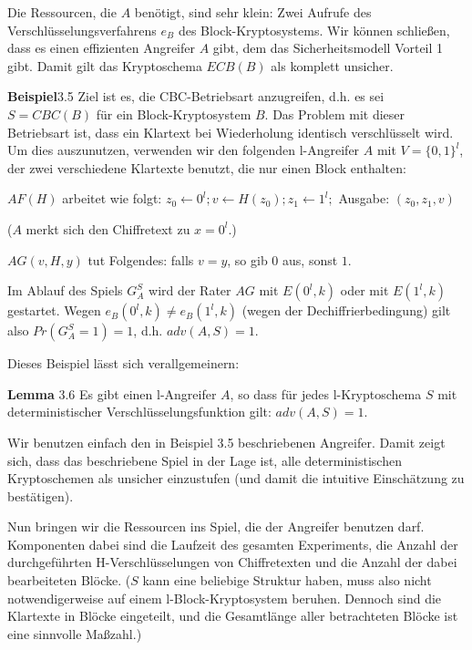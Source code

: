 \documentclass[a4paper]{article}
\begin{document}
\begin{multicols}{3}
    Die Ressourcen, die $A$ benötigt, sind sehr klein: Zwei Aufrufe des Verschlüsselungsverfahrens $e_B$ des Block-Kryptosystems. Wir können schließen, dass es einen effizienten Angreifer $A$ gibt, dem das Sicherheitsmodell Vorteil 1 gibt. Damit gilt das Kryptoschema $ECB(B)$ als komplett unsicher.

    \textbf{Beispiel}3.5 Ziel ist es, die CBC-Betriebsart anzugreifen, d.h. es sei $S=CBC(B)$ für ein Block-Kryptosystem $B$. Das Problem mit dieser Betriebsart ist, dass ein Klartext bei Wiederholung identisch verschlüsselt wird. Um dies auszunutzen, verwenden wir den folgenden l-Angreifer $A$ mit $V=\{0,1\}^l$, der zwei verschiedene Klartexte benutzt, die nur einen Block enthalten:
    \begin{itemize*}
        \item $AF(H)$ arbeitet wie folgt: $z_0\leftarrow 0^l;v\leftarrow H(z_0);z_1\leftarrow 1^l;$ Ausgabe: $(z_0,z_1,v)$
        \item ($A$ merkt sich den Chiffretext zu $x=0^l$.)
        \item $AG(v,H,y)$ tut Folgendes: falls $v=y$, so gib $0$ aus, sonst $1$.
    \end{itemize*}

    Im Ablauf des Spiels $G^S_A$ wird der Rater $AG$ mit $E(0^l,k)$ oder mit $E(1^l,k)$ gestartet. Wegen $e_B(0^l,k)\not=e_B(1^l,k)$ (wegen der Dechiffrierbedingung) gilt also $Pr(G^S_A=1)=1$, d.h. $adv(A,S)=1$.

    Dieses Beispiel lässt sich verallgemeinern:

    \textbf{Lemma} 3.6 Es gibt einen l-Angreifer $A$, so dass für jedes l-Kryptoschema $S$ mit deterministischer Verschlüsselungsfunktion gilt: $adv(A,S) = 1$.

    Wir benutzen einfach den in Beispiel 3.5 beschriebenen Angreifer. Damit zeigt sich, dass das beschriebene Spiel in der Lage ist, alle deterministischen Kryptoschemen als unsicher einzustufen (und damit die intuitive Einschätzung zu bestätigen).

    Nun bringen wir die Ressourcen ins Spiel, die der Angreifer benutzen darf. Komponenten dabei sind die Laufzeit des gesamten Experiments, die Anzahl der durchgeführten H-Verschlüsselungen von Chiffretexten und die Anzahl der dabei bearbeiteten Blöcke. ($S$ kann eine beliebige Struktur haben, muss also nicht notwendigerweise auf einem l-Block-Kryptosystem beruhen. Dennoch sind die Klartexte in Blöcke eingeteilt, und die Gesamtlänge aller betrachteten Blöcke ist eine sinnvolle Maßzahl.)


\end{multicols}
\end{document}
